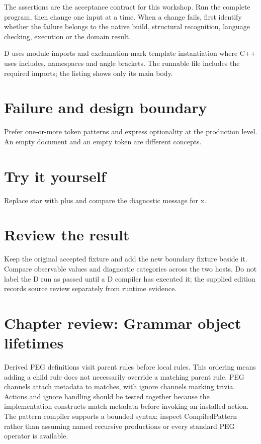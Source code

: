 The assertions are the acceptance contract for this workshop. Run the complete program, then change one input at a time. When a change fails, first identify whether the failure belongs to the native build, structural recognition, language checking, execution or the domain result.

\clearpage
{}
D uses module imports and exclamation-mark template instantiation where C++ uses includes, namespaces and angle brackets. The runnable file includes the required imports; the listing shows only its main body.


\section*{Failure and design boundary}
Prefer one-or-more token patterns and express optionality at the production level. An empty document and an empty token are different concepts.

\section*{Try it yourself}
Replace star with plus and compare the diagnostic message for x.

\section*{Review the result}
Keep the original accepted fixture and add the new boundary fixture beside it. Compare observable values and diagnostic categories across the two hosts. Do not label the D run as passed until a D compiler has executed it; the supplied edition records source review separately from runtime evidence.

\clearpage
\section*{Chapter review: Grammar object lifetimes}
Derived PEG definitions visit parent rules before local rules. This ordering means adding a child rule does not necessarily override a matching parent rule. PEG channels attach metadata to matches, with ignore channels marking trivia. Actions and ignore handling should be tested together because the implementation constructs match metadata before invoking an installed action. The pattern compiler supports a bounded syntax; inspect CompiledPattern rather than assuming named recursive productions or every standard PEG operator is available.

